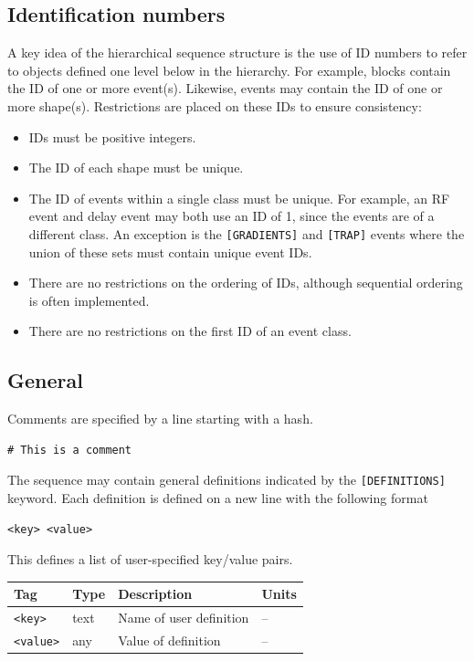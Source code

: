 \documentclass{article}
\begin{document}
\subsection{Identification numbers}
A key idea of the hierarchical sequence structure is the use of ID numbers to refer to objects defined one level below in the hierarchy. For example, blocks contain the ID of one or more event(s). Likewise, events may contain the ID of one or more shape(s). Restrictions are placed on these IDs to ensure consistency:
\begin{itemize}
\item IDs must be positive integers.
\item The ID of each shape must be unique.
\item The ID of events within a single class must be unique. For example, an RF event and delay event may both use an ID of 1, since the events are of a different class. An exception is the \verb.[GRADIENTS]. and \verb.[TRAP]. events where the union of these sets must contain unique event IDs.
\item There are no restrictions on the ordering of IDs, although sequential ordering is often implemented.
\item There are no restrictions on the first ID of an event class.
\end{itemize}

\subsection{General}

Comments are specified by a line starting with a hash.
\begin{lstlisting}
# This is a comment
\end{lstlisting}

The sequence may contain general definitions indicated by the \verb.[DEFINITIONS]. keyword. Each definition is defined on a new line with the following format
\begin{lstlisting}
<key> <value>
\end{lstlisting}
This defines a list of user-specified key/value pairs.

\begin{tabularx}{\textwidth}{llXl}
\toprule
Tag & Type & Description & Units\\
\midrule
\verb.<key>. & text & Name of user definition & -- \\
\verb.<value>. & any & Value of definition & -- \\
\bottomrule
\end{tabularx}
\end{document}
